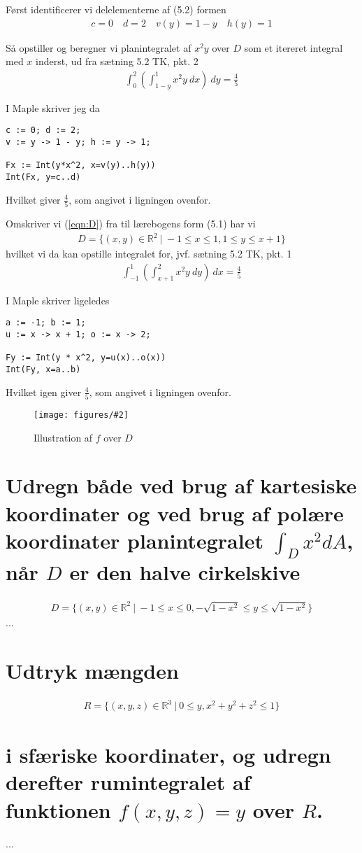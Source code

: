 \documentclass[11pt,a4paper]{article}
\newcommand{\with}[1]{{\ }d#1}
\newcommand{\Int}[4]{\int_{#1}^{#2}#3\with{#4}}
\newcommand{\fig}[4]
{
    \begin{figure}[H]
        \centering
        \texttt{[image: figures/\#2]}
        \caption{#4}
        \label{fig:#1}
    \end{figure}
}
\begin{document}
\begin{multicols}{2}
Først identificerer vi delelementerne af (5.2) formen
\begin{align}
    c = 0 \quad
    d = 2 \quad
    v(y) = 1 - y \quad
    h(y) = 1
\end{align}

Så opstiller og beregner vi planintegralet af $x^2 y$ over $D$ som et
itereret integral med $x$ inderst, ud fra sætning 5.2 TK, pkt. 2
\begin{align}
    \Int{0}{2}{ \left( \Int{1-y}{1}{x^2 y}{x} \right) }{y}
    =
    \frac{4}{5}
\end{align}

I Maple skriver jeg da
\begin{lstlisting}
c := 0; d := 2;
v := y -> 1 - y; h := y -> 1;

Fx := Int(y*x^2, x=v(y)..h(y))
Int(Fx, y=c..d)
\end{lstlisting}
Hvilket giver $\frac{4}{5}$, som angivet i ligningen ovenfor.

Omskriver vi (\ref{eqn:D}) fra til lærebogens form (5.1) har vi
\begin{align}
    D = \{ (x,y) \in \mathbb{R}^2{\ }|{\ }-1 \leq x \leq 1, 1 \leq y \leq x + 1 \}
\end{align}
hvilket vi da kan opstille integralet for, jvf. sætning 5.2 TK, pkt. 1
\begin{align}
    \Int{-1}{1}{ \left( \Int{x+1}{2}{x^2 y}{y} \right) }{x}
    = \frac{4}{5}
\end{align}

I Maple skriver ligeledes
\begin{lstlisting}
a := -1; b := 1;
u := x -> x + 1; o := x -> 2;

Fy := Int(y * x^2, y=u(x)..o(x))
Int(Fy, x=a..b)
\end{lstlisting}
Hvilket igen giver $\frac{4}{5}$, som angivet i ligningen ovenfor.

\fig{9-1-f}{9-1-f.png}{0.5}{Illustration af $f$ over $D$}

\end{multicols}

\newpage
\section
{
    \mdseries
    Udregn både ved brug af kartesiske koordinater og ved brug af polære
    koordinater planintegralet $\int_D x^2 d A$, når $D$ er den halve
    cirkelskive
}
\begin{align}
    D = \{ (x,y) \in \mathbb{R}^2{\ }|{\ }
        -1 \leq x \leq 0,
    -\sqrt{1 - x^2} \leq y \leq \sqrt{1 - x^2} \}
\end{align}
...


\section
{
    \mdseries
    Udtryk mængden
}
\begin{align}
    R = \{ (x,y,z) \in \mathbb{R}^3{\ }|{\ }0 \leq y, x^2 + y^2 + z^2 \leq 1 \}
\end{align}
\section*
{
    \mdseries
    i sfæriske koordinater, og udregn derefter rumintegralet af funktionen
    $f(x,y,z) = y$ over $R$.
}
...
\end{document}

